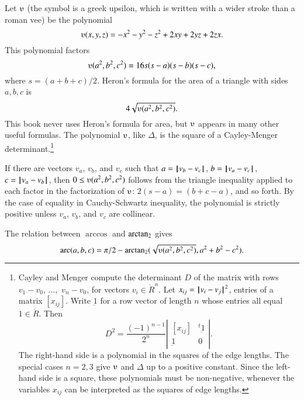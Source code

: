 Let $\ups$ (the symbol is a greek upsilon, which is written with a
wider stroke than a roman vee) be the polynomial
    $$\ups(x,y,z) = -x^2 - y^2 - z^2 + 2 x y + 2 y z + 2 z x.$$
This polynomial factors
    $$\ups(a^2,b^2,c^2) = 16 s (s-a) (s-b) (s-c),$$
where $s = (a+b+c)/2$.  Heron's formula for the area of 
a triangle with
sides $a,b,c$ is $$4\sqrt{\ups(a^2,b^2,c^2)}.$$  This
book never uses Heron's formula for area, but $\ups$
appears in many other useful formulas.
The polynomial
$\ups$, like $\Delta$, 
is the square of a Cayley-Menger determinant.\footnote{

Cayley and Menger compute the determinant $D$ of the
matrix with rows $v_1-v_0$, $\ldots,$ $v_n-v_0$, 
for vectors $v_i\in\ring{R}^n$.   Let
$x_{ij} = {\hskip0.1em|\hskip-0.15em|\hskip0.1em}v_i - v_j{\hskip0.1em|\hskip-0.15em|\hskip0.1em}^2$, entries of a matrix $[x_{ij}]$.
Write $\underbar 1$ for a row vector of length $n$ 
whose entries all equal $1\in\ring{R}$.
Then 
$$
D^2 = \frac{(-1)^{n-1}}{2^n}
    \left|\begin{matrix}[x_{ij}]& {}^t{\underbar 1}\\ {\underbar 1}& 0
        \end{matrix}\right|.
$$
The right-hand side is a polynomial in the squares of the edge lengths.
The special cases $n=2,3$ give $\ups$  and $\Delta$ up to a positive constant.  Since
the left-hand side is a square, these polynomials must
be non-negative, whenever the variables $x_{ij}$ can be interpreted
as the squares of edge lengths.}


If there are vectors $v_a$, $v_b$, and $v_c$ such that $a = {\hskip0.1em|\hskip-0.15em|\hskip0.1em}v_b
 -  v_c{\hskip0.1em|\hskip-0.15em|\hskip0.1em}$, $b = {\hskip0.1em|\hskip-0.15em|\hskip0.1em}v_a  -  v_c{\hskip0.1em|\hskip-0.15em|\hskip0.1em}$, $c = {\hskip0.1em|\hskip-0.15em|\hskip0.1em}v_a  -  v_b{\hskip0.1em|\hskip-0.15em|\hskip0.1em}$, then $0\le
\ups(a^2,b^2,c^2)$ follows from the triangle inequality applied to
each factor in the factorization of $\ups$: $2(s-a) = (b+c-a)$, and
so forth.  By the case of equality in Cauchy-Schwartz
inequality, the polynomial is strictly positive unless $v_a$,
$v_b$, and $v_c$ are collinear.

The relation between $\arccos$ and ${\operatorname{arctan_2}}$ gives
  $$
  \arc(a,b,c) = 
    \pi/2 - \atn({\sqrt{\ups(a^2,b^2,c^2)}},{ a^2 + b^2 - c^2}).
    $$



